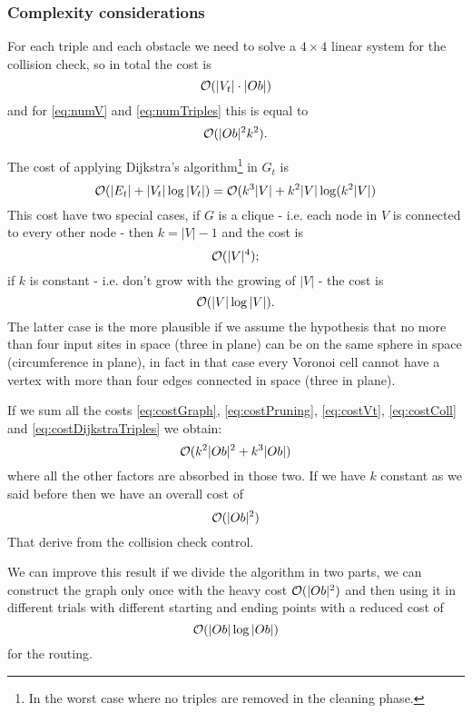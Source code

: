 \documentclass[dissertation.tex]{subfiles}
\begin{document}
\subsubsection{Complexity considerations}
For each triple and each obstacle we need to solve a $4\times 4$
linear system for the
collision check, so in total the cost is
\begin{equation*}
  \mathcal{O}(|V_t|\cdot |Ob|)
\end{equation*}
and for \cref{eq:numV} and \cref{eq:numTriples} this is equal to
\begin{equation}
  \label{eq:costColl}
  \mathcal{O}(|Ob|^2 k^2).
\end{equation}

The cost of applying Dijkstra's algorithm\footnote{In the worst case
  where no triples are removed in the cleaning phase.} in $G_t$ is
\begin{equation}
  \label{eq:costDijkstraTriples}
  \mathcal{O}(|E_t|+|V_t|\log |V_t|) = \mathcal{O}(k^3|V|+k^2|V|\log(k^2|V|)
\end{equation}
This cost have two special cases, if $G$ is a clique - i.e. each
node in $V$ is connected to every other node - then $k=|V|-1$ and the
cost is
\begin{equation*}
  \mathcal{O}(|V|^4);
\end{equation*}
if $k$ is constant - i.e. don't grow with the growing of $|V|$ - the
cost is
\begin{equation*}
  \mathcal{O}(|V|\log|V|).
\end{equation*}
The latter case is the more plausible if we assume the hypothesis that
no more than four input sites in space (three in plane) can be on the
same sphere in space (circumference in plane), in fact in that case
every Voronoi cell cannot have a vertex with more than four edges
connected in space (three in plane).

If we sum all the costs \cref{eq:costGraph}, \cref{eq:costPruning},
\cref{eq:costVt},
\cref{eq:costColl} and
\cref{eq:costDijkstraTriples} we obtain:
\begin{equation*}
  \mathcal{O}(k^2|Ob|^2+k^3|Ob|)
\end{equation*}
where all the other factors are absorbed in those two. If we have $k$
constant as we said before then we have an overall cost of
\begin{equation*}
  \mathcal{O}(|Ob|^2)
\end{equation*}
That derive from the collision check control.

We can improve this result if we divide the algorithm in two parts, we
can construct the graph only once with the heavy cost $\mathcal{O}(|Ob|^2)$
and then using
it in different trials with different starting and ending points with
a reduced cost of
\begin{equation*}
  \mathcal{O}(|Ob|\log |Ob|)
\end{equation*}
for the routing.
\end{document}
